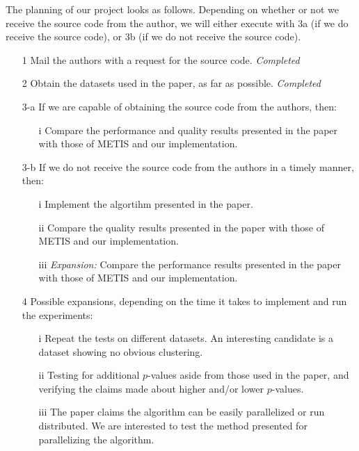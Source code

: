 \documentclass[a4paper,11pt]{article}
\begin{document}
The planning of our project looks as follows. Depending on whether or not we receive the source code from the author, we will either execute with 3a (if we do receive the source code), or 3b (if we do not receive the source code).
\begin{enumerate}
\item[1] Mail the authors with a request for the source code. \textit{Completed}
\item[2] Obtain the datasets used in the paper, as far as possible. \textit{Completed}
\item[3-a] If we are capable of obtaining the source code from the authors, then:
\begin{enumerate}
\item[i] Compare the performance and quality results presented in the paper with those of METIS and our implementation.
\end{enumerate}
\item[3-b] If we do not receive the source code from the authors in a timely manner, then:
\begin{enumerate}
\item[i] Implement the algortihm presented in the paper.
\item[ii] Compare the quality results presented in the paper with those of METIS and our implementation.
\item[iii] \textit{Expansion:} Compare the performance results presented in the paper with those of METIS and our implementation.
\end{enumerate}
\item[4] Possible expansions, depending on the time it takes to implement and run the experiments:
\begin{enumerate}
\item[i] Repeat the tests on different datasets. An interesting candidate is a dataset showing no obvious clustering. %
\item[ii] Testing for additional $p$-values aside from those used in the paper, and verifying the claims made about higher and/or lower $p$-values.
\item[iii] The paper claims the algorithm can be easily parallelized or run distributed. We are interested to test the method presented for parallelizing the algorithm.
\end{enumerate}
\end{enumerate}
\end{document}
